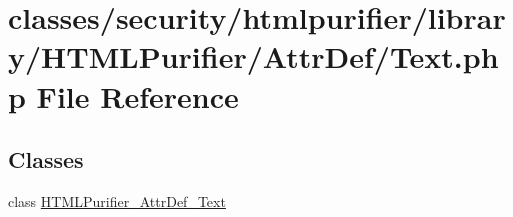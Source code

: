\hypertarget{AttrDef_2Text_8php}{\section{classes/security/htmlpurifier/library/\+H\+T\+M\+L\+Purifier/\+Attr\+Def/\+Text.php File Reference}
\label{AttrDef_2Text_8php}
}
\subsection*{Classes}
\begin{DoxyCompactItemize}
\item 
class \hyperlink{classHTMLPurifier__AttrDef__Text}{H\+T\+M\+L\+Purifier\+\_\+\+Attr\+Def\+\_\+\+Text}
\end{DoxyCompactItemize}
